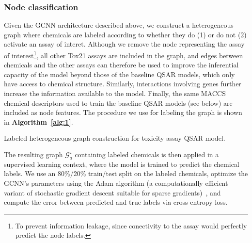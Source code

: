 \documentclass{ws-procs11x85}
\begin{document}
\subsubsection{Node classification}\label{methods-nc}
Given the GCNN architecture described above, we construct a heterogeneous graph where chemicals are labeled according to whether they do (1) or do not (2) activate an assay of interet.
Although we remove the node representing the assay of interest\footnote{To prevent information leakage, since conectivity to the assay would perfectly predict the node labels.}, all other Tox21 assays are included in the graph, and edges between chemicals and the other assays can therefore be used to improve the inferential capacity of the model beyond those of the baseline QSAR models, which only have access to chemical structure.
Similarly, interactions involving genes further increase the information available to the model.
Finally, the same MACCS chemical descriptors used to train the baseline QSAR models (see below) are included as node features.
The procedure we use for labeling the graph is shown in \textbf{Algorithm~\ref{alg:1}}.

\begin{algorithm}
\caption{Labeled heterogeneous graph construction for toxicity assay QSAR model.}\label{alg:1}
\begin{algorithmic}
   \Else
   \EndIf
\EndFor
{}
\end{algorithmic}
\end{algorithm}

The resulting graph $\mathcal{G}_a^\star$ containing labeled chemicals is then applied in a supervised learning context, where the model is trained to predict the chemical labels.
We use an 80\%/20\% train/test split on the labeled chemicals, optimize the GCNN's parameters using the Adam algorithm (a computationally efficient variant of stochastic gradient descent suitable for sparse gradients)~\cite{kingma2014adam}, and compute the error between predicted and true labels via cross entropy loss.
\end{document}
